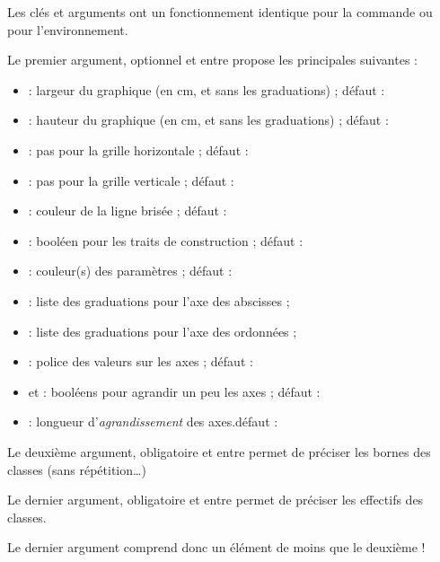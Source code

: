 \begin{cautionblock}
Les clés et arguments ont un fonctionnement identique pour la commande ou pour l'environnement.

\smallskip

Le premier argument, optionnel et entre \ctex{[...]} propose les  principales suivantes :

\begin{itemize}
	\item {} : largeur du graphique (en cm, et sans les graduations) ; \hfill{}défaut : 
	\item {} : hauteur du graphique (en cm, et sans les graduations) ; \hfill{}défaut : 
	\item {} : pas pour la grille horizontale ; \hfill{}défaut : 
	\item {} : pas pour la grille verticale ; \hfill{}défaut : 
	\item {} : couleur de la ligne brisée ; \hfill{}défaut : 
	\item {} : booléen pour les traits de construction ; \hfill{}défaut : 
	\item {} : couleur(s) des paramètres ; \hfill{}défaut : 
	\item {} : liste des graduations pour l'axe des abscisses ;
	\item {} : liste des graduations pour l'axe des ordonnées ;
	\item {} : police des valeurs sur les axes ; \hfill{}défaut : 
	\item {} et  : booléens pour agrandir un peu les axes ; \hfill{}défaut : 
	\item {} : longueur d'\textit{agrandissement} des axes.\hfill{}défaut : \Cle{3mm}
\end{itemize}

Le deuxième argument, obligatoire et entre  permet de préciser les bornes des classes (sans répétition\ldots)

Le dernier argument, obligatoire et entre  permet de préciser les effectifs des classes.

\smallskip

Le dernier argument comprend donc un élément de moins que le deuxième !
\end{cautionblock}


